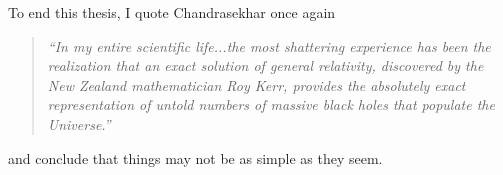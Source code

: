 \bigskip

To end this thesis, I quote Chandrasekhar once again

\begin{quote}
    \emph{``In my entire scientific life...the most shattering experience has been the realization that an exact solution of general relativity, discovered by the New Zealand mathematician Roy Kerr, provides the absolutely exact representation of untold numbers of massive black holes that populate the Universe.''}
\end{quote}

and conclude that things may not be as simple as they seem.

